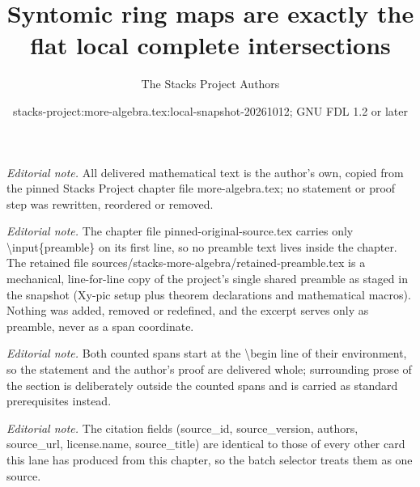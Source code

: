 \documentclass[10pt,a4paper]{amsart}
\title{Syntomic ring maps are exactly the flat local complete intersections}
\author{The Stacks Project Authors}
\date{stacks-project:more-algebra.tex:local-snapshot-20261012; GNU FDL 1.2 or later}
\theoremstyle{plain}
\theoremstyle{definition}
\theoremstyle{remark}
\numberwithin{equation}{subsection}
\begin{document}
\maketitle
\setcounter{subsection}{1}
\noindent\textit{Editorial note.} All delivered mathematical text is the author's own, copied from the pinned Stacks Project chapter file more-algebra.tex; no statement or proof step was rewritten, reordered or removed.\par\medskip
\noindent\textit{Editorial note.} The chapter file pinned-original-source.tex carries only \textbackslash{}input\{preamble\} on its first line, so no preamble text lives inside the chapter. The retained file sources/stacks-more-algebra/retained-preamble.tex is a mechanical, line-for-line copy of the project's single shared preamble as staged in the snapshot (Xy-pic setup plus theorem declarations and mathematical macros). Nothing was added, removed or redefined, and the excerpt serves only as preamble, never as a span coordinate.\par\medskip
\noindent\textit{Editorial note.} Both counted spans start at the \textbackslash{}begin line of their environment, so the statement and the author's proof are delivered whole; surrounding prose of the section is deliberately outside the counted spans and is carried as standard prerequisites instead.\par\medskip
\noindent\textit{Editorial note.} The citation fields (source\_id, source\_version, authors, source\_url, license.name, source\_title) are identical to those of every other card this lane has produced from this chapter, so the batch selector treats them as one source.\par\medskip
\end{document}
